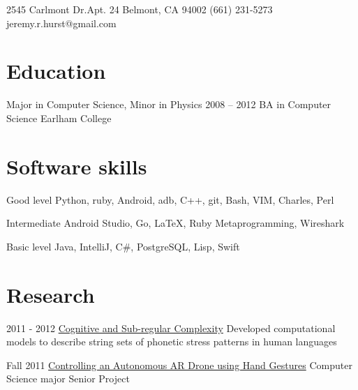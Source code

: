 \documentclass[oldfontcommands]{tccv}
\begin{document}
\personal
    {2545 Carlmont Dr.\newline Apt. 24 \newline Belmont, CA 94002}
    {(661) 231-5273}
    {jeremy.r.hurst@gmail.com}

\section{Education}

\begin{yearlist}

\item[Major in Computer Science, Minor in Physics]{2008 -- 2012}
     {BA in Computer Science}
     {Earlham College}

\end{yearlist}

\section{Software skills}

\begin{factlist}

\item{Good level}
     {Python, ruby, Android, adb, C++, git, Bash, VIM, Charles, Perl}

\item{Intermediate}
     {Android Studio, Go, \LaTeX, Ruby Metaprogramming, Wireshark}

\item{Basic level}
     {Java, IntelliJ, C\#, PostgreSQL, Lisp, Swift}

\end{factlist}

\section{Research}

\begin{yearlist}
\item{2011 - 2012}
     {\href{http://link.springer.com/chapter/10.1007/978-3-642-39998-5_6\#page-1}{Cognitive and Sub-regular Complexity}}
     {Developed computational models to describe string sets of phonetic stress patterns in human languages}

\item{Fall 2011}
     {\href{https://www.youtube.com/watch?v=69phrToFKyI}{Controlling an Autonomous AR Drone using Hand Gestures}}
     {Computer Science major Senior Project}
\end{yearlist}
\end{document}
